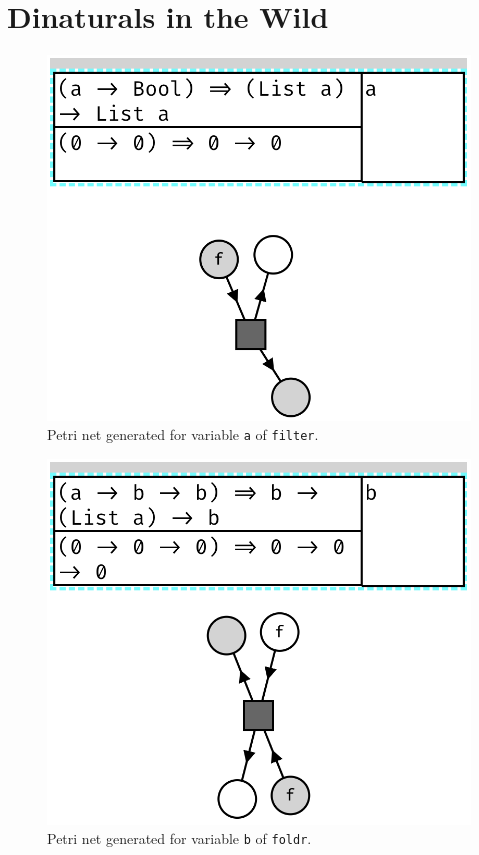 \documentclass[11pt,openright,hidelinks,a4paper]{article}
\begin{document}
\section{Dinaturals in the Wild}\label{app:wilddinaturals}

\begin{figure}[H]
\begin{center}
\includegraphics[scale=0.45]{filter}
\end{center}
\caption{Petri net generated for variable \lstinline{a} of \lstinline{filter}.}
\label{fig:filter}
\end{figure}

\begin{figure}[H]
\begin{center}
\includegraphics[scale=0.45]{foldr}
\end{center}
\caption{Petri net generated for variable \lstinline{b} of \lstinline{foldr}.}
\label{fig:foldr}
\end{figure}
\end{document}
